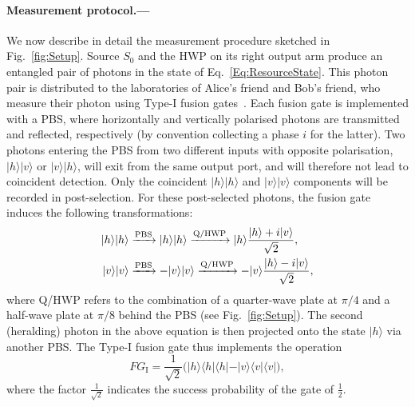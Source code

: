 \documentclass[aps,floatfix,superscriptaddress,twocolumn,tightenlines,amsmath,amssymb,nofootinbib,10pt]{revtex4-1}
\newcommand{\bra}[1] {\langle #1 |}
\newcommand{\ket}[1] {| #1 \rangle}
\begin{document}
\paragraph*{Measurement protocol.--- }
We now describe in detail the measurement procedure sketched in Fig.~\ref{fig:Setup}. Source $S_0$ and the HWP on its right output arm produce an entangled pair of photons in the state of Eq.~\eqref{Eq:ResourceState}. This photon pair is distributed to the laboratories of Alice's friend and Bob's friend, who measure their photon using Type-I fusion gates~\cite{Browne2005}. Each fusion gate is implemented with a PBS, where horizontally and vertically polarised photons are transmitted and reflected, respectively (by convention collecting a phase $i$ for the latter). Two photons entering the PBS from two different inputs with opposite polarisation, $\ket{h}\ket{v}$ or $\ket{v}\ket{h}$, will exit from the same output port, and will therefore not lead to coincident detection. Only the coincident $\ket{h}\ket{h}$ and $\ket{v}\ket{v}$ components will be recorded in post-selection. For these post-selected photons, the fusion gate induces the following transformations:   
\begin{align}
\ket{h}\ket{h} & \xrightarrow{\text{PBS}} \ket{h}\ket{h} \xrightarrow{\text{Q/HWP}} \ket{h}\frac{\ket{h}+i\ket{v}}{\sqrt{2}}, \notag \\
\ket{v}\ket{v} & \xrightarrow{\text{PBS}} -\ket{v}\ket{v} \xrightarrow{\text{Q/HWP}} -\ket{v}\frac{\ket{h}-i\ket{v}}{\sqrt{2}},
\end{align}
where Q/HWP refers to the combination of a quarter-wave plate at $\pi/4$ and a half-wave plate at $\pi/8$ behind the PBS (see Fig.~\ref{fig:Setup}). The second (heralding) photon in the above equation is then projected onto the state $\ket{h}$ via another PBS. The Type-I fusion gate thus implements the operation
\begin{equation}
FG_\text{I} = \frac{1}{\sqrt{2}} \big( \ket{h}\bra{h}\bra{h} - \ket{v}\bra{v}\bra{v} \big),
\end{equation}
where the factor $\frac{1}{\sqrt{2}}$ indicates the success probability of the gate of $\frac 1 2$.
\end{document}
